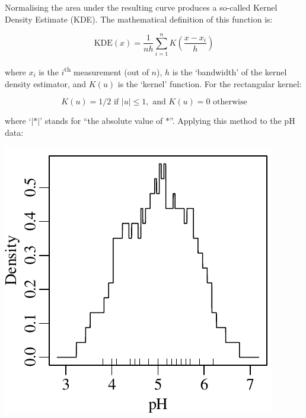 Normalising the area under the resulting curve produces a so-called
Kernel Density Estimate (KDE). The mathematical definition of this
function is:

\begin{equation}
  \mbox{KDE}(x) = \frac{1}{nh} \sum\limits_{i=1}^{n} K\!\left(\frac{x-x_i}{h}\right)
  \label{eq:KDE}
\end{equation}

\noindent where $x_i$ is the $i$\textsuperscript{th} measurement (out
of $n$), $h$ is the `bandwidth' of the kernel density estimator, and
$K(u)$ is the `kernel' function. For the rectangular kernel:

\begin{equation}
  K(u) = 1/2 \mbox{~if~}|u| \leq 1, \mbox{~and~} K(u) = 0 \mbox{~otherwise}
\end{equation}

\noindent where `$|\ast|$' stands for ``the absolute value of
$\ast$''. Applying this method to the pH data:

\noindent\begin{minipage}[t][][b]{.3\textwidth}
  \includegraphics[width=\textwidth]{../figures/pHrectKDE.pdf}\medskip
\end{minipage}
\begin{minipage}[t][][t]{.7\textwidth}
  \label{fig:pHrectKDE}
\end{minipage}

